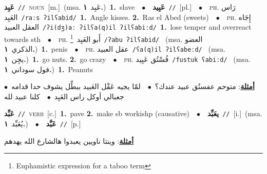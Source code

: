 \documentclass[10pt,a4paper,twoside]{article} %
\begin{document}
\begin{multicols}{2}
{{\setlength\topsep{0pt}\textbf{\foreignlanguage{arabic}{عَبِد}}\ {\color{gray}\texttt{//}\color{black}}\ \textsc{noun}\ [m.]\ \color{gray}(msa. \foreignlanguage{arabic}{عَبِد}~\foreignlanguage{arabic}{\textbf{١.}})\color{black}\ \textbf{1.}~slave\ \ $\bullet$\ \ \setlength\topsep{0pt}\textbf{\foreignlanguage{arabic}{عَبِيد}}\ {\color{gray}\texttt{//}\color{black}}\ [pl.]\ \ $\bullet$\ \ \textsc{ph.} \color{gray} \foreignlanguage{arabic}{رَاس العَبِد}\color{black}\ {\color{gray}\texttt{/{\sffamily raːs ʔilʕabid}/}\color{black}}\ \textbf{1.}~Angle kisses.  \textbf{2.}~Ras el Abed (sweets)\ \ $\bullet$\ \ \textsc{ph.} \color{gray} \foreignlanguage{arabic}{إِجَاه العقل العبيد}\color{black}\ {\color{gray}\texttt{/{\sffamily ʔi(dʒ)aː ʔilʕa(q)il ʔilʕabiːd}/}\color{black}}\ \textbf{1.}~lose temper and overreact towards sth\ \ $\bullet$\ \ \textsc{ph.} \color{gray} \foreignlanguage{arabic}{أَبو العَبِد}\color{black}\ \footnote{Euphamistic expression for a taboo term}\ {\color{gray}\texttt{/{\sffamily ʔabu ʔilʕabid}/}\color{black}}\ \color{gray} (msa. \foreignlanguage{arabic}{العضو الذكري}~\foreignlanguage{arabic}{\textbf{١.}})\color{black}\ \textbf{1.}~penis\ \ $\bullet$\ \ \textsc{ph.} \color{gray} \foreignlanguage{arabic}{عقل العبيد}\color{black}\ {\color{gray}\texttt{/{\sffamily ʕa(q)il ʔilʕabeːd}/}\color{black}}\ \color{gray} (msa. \foreignlanguage{arabic}{يجِن}~\foreignlanguage{arabic}{\textbf{١.}})\color{black}\ \textbf{1.}~go nuts.  \textbf{2.}~go crazy\ \ $\bullet$\ \ \textsc{ph.} \color{gray} \foreignlanguage{arabic}{فُسْتُق عَبِيد}\color{black}\ {\color{gray}\texttt{/{\sffamily fustuk ʕabiːd}/}\color{black}}\ \color{gray} (msa. \foreignlanguage{arabic}{فول سوداني}~\foreignlanguage{arabic}{\textbf{١.}})\color{black}\ \textbf{1.}~Peanuts\  \begin{flushright}\color{gray}\foreignlanguage{arabic}{\textbf{\underline{\foreignlanguage{arabic}{أمثلة}}}: متوحم عفستُق عبيد عندك؟\ $\bullet$\ \  لمّا يجيه عَقْل العَبيد ببطِّل يشوف حدا قدامه\ $\bullet$\ \  جعبالي أوكل راس العَبِد\ $\bullet$\ \  كلنا عبيد لله}\end{flushright}\color{black}} \vspace{2mm}

{\setlength\topsep{0pt}\textbf{\foreignlanguage{arabic}{عَبِّد}}\ {\color{gray}\texttt{//}\color{black}}\ \textsc{verb}\ [c.]\ \textbf{1.}~pave  \textbf{2.}~make sb workishp (causative)\ \ $\bullet$\ \ \setlength\topsep{0pt}\textbf{\foreignlanguage{arabic}{يعَبِّد}}\ {\color{gray}\texttt{//}\color{black}}\ [i.]\ \color{gray}(msa. \foreignlanguage{arabic}{يُعَبِّد}~\foreignlanguage{arabic}{\textbf{١.}})\color{black}\ \ $\bullet$\ \ \setlength\topsep{0pt}\textbf{\foreignlanguage{arabic}{عَبَّد}}\ {\color{gray}\texttt{//}\color{black}}\ [p.]\  \begin{flushright}\color{gray}\foreignlanguage{arabic}{\textbf{\underline{\foreignlanguage{arabic}{أمثلة}}}: وينتا ناويين يعبدوا هالشارع الله يهدهم}\end{flushright}\color{black}} \vspace{2mm}

}
\end{multicols}
\end{document}

